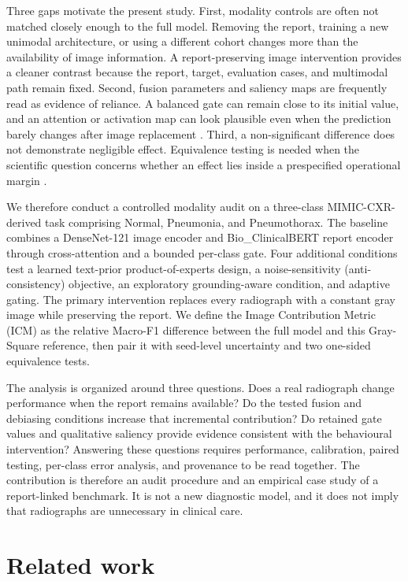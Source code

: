 \documentclass[10pt,a4paper,twocolumn]{article}
\begin{document}
Three gaps motivate the present study. First, modality controls are often not
matched closely enough to the full model. Removing the report, training a new
unimodal architecture, or using a different cohort changes more than the
availability of image information. A report-preserving image intervention
provides a cleaner contrast because the report, target, evaluation cases, and
multimodal path remain fixed. Second, fusion parameters and saliency maps are
frequently read as evidence of reliance. A balanced gate can remain close to its
initial value, and an attention or activation map can look plausible even when
the prediction barely changes after image replacement
\cite{arevalo2017gmu,selvaraju2017gradcam}. Third, a non-significant difference
does not demonstrate negligible effect. Equivalence testing is needed when the
scientific question concerns whether an effect lies inside a prespecified
operational margin \cite{lakens2017equivalence}.

We therefore conduct a controlled modality audit on a three-class
MIMIC-CXR-derived task comprising Normal, Pneumonia, and Pneumothorax. The
baseline combines a DenseNet-121 image encoder and Bio\_ClinicalBERT report
encoder through cross-attention and a bounded per-class gate. Four additional
conditions test a learned text-prior product-of-experts design, a
noise-sensitivity (anti-consistency) objective, an exploratory grounding-aware
condition, and adaptive gating. The primary intervention replaces every
radiograph with a constant gray image while preserving the report. We define
the Image Contribution Metric (ICM) as the relative Macro-F1 difference between
the full model and this Gray-Square reference, then pair it with seed-level
uncertainty and two one-sided equivalence tests.

The analysis is organized around three questions. Does a real radiograph change
performance when the report remains available? Do the tested fusion and
debiasing conditions increase that incremental contribution? Do retained gate
values and qualitative saliency provide evidence consistent with the
behavioural intervention? Answering these questions requires performance,
calibration, paired testing, per-class error analysis, and provenance to be read
together. The contribution is therefore an audit procedure and an empirical
case study of a report-linked benchmark. It is not a new diagnostic model, and
it does not imply that radiographs are unnecessary in clinical care.

\section{Related work}\label{sec:related-work}
\end{document}
